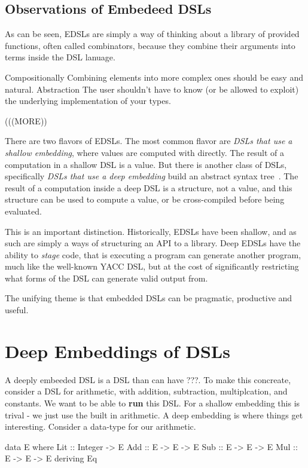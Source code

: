 \documentclass[11pt]{article}
\begin{document}
\subsection{Observations of Embedeed DSLs}

As can be seen, EDSLs are simply a way of thinking about a library
of provided functions, often called combinators, because they combine
their arguments into terms inside the DSL lanuage.

Compositionally
Combining elements into more complex ones should be easy and natural.
Abstraction
The user shouldn’t have to know (or be allowed to exploit) the underlying implementation of your types.

(((MORE))

There are two flavors of EDSLs.
The most common flavor are
{\em DSLs that use a shallow embedding\/}, where values are computed with directly.
The result of a computation in a shallow DSL is a value.
But there is another class of DSLs, 
specifically {\em DSLs that use a deep embedding\/} build an abstract syntax tree~\cite{Elliott:03:CompileDSEL-JFP}.
The result of a computation inside a deep DSL
is a structure, not a value, and this structure can be used to compute a value,
or be cross-compiled before being evaluated.

This is an important distinction. Historically, EDSLs have been shallow,
and as such are simply a ways of structuring an API to a library. Deep EDSLs
have the ability to {\em stage\/} code, that is executing a program
can generate another program, much like the well-known YACC DSL,
but at the cost of significantly restricting what forms of the DSL can
generate valid output from.

The unifying theme is that embedded DSLs can
be pragmatic, productive and useful. 

\section{Deep Embeddings of DSLs}

A deeply embeeded DSL is a DSL than can have ???.
To make this concreate, consider a DSL for arithmetic,
with addition, subtraction, multiplcation, and constants.
We want to be able to {\bf run\/} this DSL. For a shallow
embedding this is trival - we just use the built in 
arithmetic. A deep embedding is where things get
interesting. Consider a data-type for our arithmetic.

\begin{Code}
data E where
 Lit :: Integer  -> E
 Add :: E -> E -> E
 Sub :: E -> E -> E
 Mul :: E -> E -> E
 deriving Eq
\end{Code}
\end{document}
